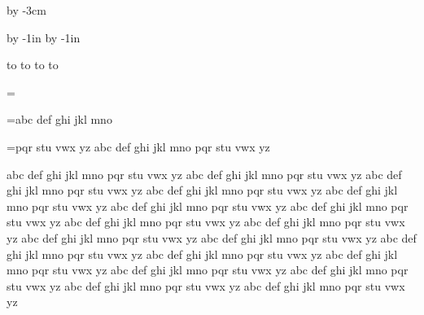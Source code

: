 




\bye






\hsize=210mm
\vsize=297mm

\parindent=0pt

\advance\vsize by -3cm

\advance\voffset by -1in
\advance\hoffset by -1in



\def\epsfsize#1#2{#1}

\vbox to 
\eject
\vbox to 
\eject
\vbox to 
\eject
\vbox to 
\eject

\bye

\tracingall
{}

\newbox\collectbox

\collectbox=\vbox{}

\collectbox=\vbox{\unvcopy\collectbox abc def ghi jkl mno}

\unvcopy\collectbox

\vskip1in

\collectbox=\vbox{\unvcopy\collectbox pqr stu vwx yz abc def ghi jkl mno pqr stu vwx yz}

\unvcopy\collectbox


\bye


abc def ghi jkl mno pqr stu vwx yz abc def ghi jkl mno pqr stu vwx yz
abc def ghi jkl mno pqr stu vwx yz abc def ghi jkl mno pqr stu vwx yz
abc def ghi jkl mno pqr stu vwx yz abc def ghi jkl mno pqr stu vwx yz
abc def ghi jkl mno pqr stu vwx yz abc def ghi jkl mno pqr stu vwx yz
abc def ghi jkl mno pqr stu vwx yz abc def ghi jkl mno pqr stu vwx yz
abc def ghi jkl mno pqr stu vwx yz abc def ghi jkl mno pqr stu vwx yz
abc def ghi jkl mno pqr stu vwx yz abc def ghi jkl mno pqr stu vwx yz
abc def ghi jkl mno pqr stu vwx yz abc def ghi jkl mno pqr stu vwx yz
abc def ghi jkl mno pqr stu vwx yz abc def ghi jkl mno pqr stu vwx yz




\bye


